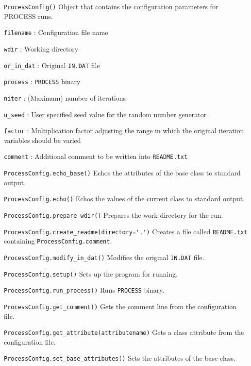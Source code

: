 \documentclass[11pt,a4paper]{report}
\newcommand{\indat}{\mbox{\texttt{IN.DAT}}}
\newcommand{\process}{\mbox{\texttt{PROCESS}}}
\begin{document}
\begin{description}

\item{\verb|ProcessConfig()|} Object that contains the configuration
  parameters for PROCESS runs.

  \verb|filename| : Configuration file name

  \verb|wdir| : Working directory

  \verb|or_in_dat| : Original \indat\/ file

  \verb|process| : \process\/ binary

  \verb|niter| : (Maximum) number of iterations

  \verb|u_seed| : User specified seed value for the random number generator

  \verb|factor| : Multiplication factor adjusting the range in which the
  original iteration variables should be varied

  \verb|comment| : Additional comment to be written into \verb|README.txt|

\item{\verb|ProcessConfig.echo_base()|} Echos the attributes of the base class
  to standard output.

\item{\verb|ProcessConfig.echo()|} Echos the values of the current class to
  standard output.

\item{\verb|ProcessConfig.prepare_wdir()|} Prepares the work directory for the
  run.

\item{\verb|ProcessConfig.create_readme(directory='.')|} Creates a file called
  \texttt{README.txt} containing \texttt{ProcessConfig.comment}.

\item{\verb|ProcessConfig.modify_in_dat()|} Modifies the original \indat\/
  file.

\item{\verb|ProcessConfig.setup()|} Sets up the program for running.

\item{\verb|ProcessConfig.run_process()|} Runs \process\/ binary.

\item{\verb|ProcessConfig.get_comment()|} Gets the comment line from the
  configuration file.

\item{\verb|ProcessConfig.get_attribute(attributename)|} Gets a class
  attribute from the configuration file.

\item{\verb|ProcessConfig.set_base_attributes()|} Sets the attributes of the
  base class.

\end{description}
\end{document}
